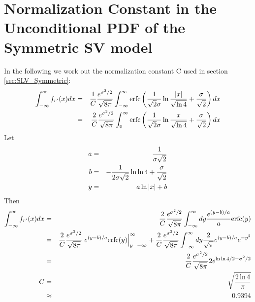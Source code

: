 \chapter{Normalization Constant in the Unconditional PDF of the
  Symmetric SV model}
\label{chp:symmetric_SV_norm_const}
In the following we work out the normalization constant C used in
section \ref{sec:SLV_Symmetric}:
\begin{eqnarray*}
  \int_{-\infty}^{\infty} f_{r'}(x) dx &=& {1 \over C}{e^{\sigma^2 / 2} \over
    \sqrt{8\pi}} \int_{-\infty}^{\infty} \text{erfc} \left({1 \over
      \sqrt{2}\sigma} \ln{|x| \over \sqrt{\ln 4}} + {\sigma \over
      \sqrt{2}} \right) dx\\
  &=& {2 \over C}{e^{\sigma^2 / 2} \over
    \sqrt{8\pi}} \int_{0}^{\infty} \text{erfc} \left({1 \over
      \sqrt{2}\sigma} \ln{x \over \sqrt{\ln 4}} + {\sigma \over
      \sqrt{2}} \right) dx\\
\end{eqnarray*}
Let
\begin{eqnarray*}
  a &=& {1 \over \sigma \sqrt 2} \\
  b &=& -{1 \over 2 \sigma \sqrt 2}\ln\ln 4 + {\sigma \over \sqrt 2} \\
  y &=& a\ln|x|+b \\
\end{eqnarray*}
Then
\begin{eqnarray*}
  \int_{-\infty}^{\infty} f_{r'}(x) dx &=& {2 \over C}{e^{\sigma^2 / 2} \over
    \sqrt{8\pi}} \int_{-\infty}^{\infty} dy {e^{(y-b)/a} \over a}
  \text{erfc}(y) \\
  &=& {2 \over C}{e^{\sigma^2 / 2} \over
    \sqrt{8\pi}} \left.e^{(y-b)/a}
    \text{erfc}(y)\right|_{y=-\infty}^{\infty}
  + {2 \over C}{e^{\sigma^2 / 2} \over
    \sqrt{8\pi}} \int_{-\infty}^{\infty} dy {2 \over \sqrt \pi}
  e^{(y-b)/a} e^{-y^2} \\
  &=& {2 \over C}{e^{\sigma^2 / 2} \over \sqrt{8\pi}}  2 e^{\ln\ln 4/2
    - \sigma^2/2}\\
  C &=& \sqrt{2 \ln 4\over \pi} \\
  &\approx& 0.9394
\end{eqnarray*}

